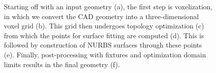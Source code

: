\begin{figure}[ht]
\begin{center}
        \caption{Starting off with an input geometry (a), the first step is voxelization, in which we convert the CAD geometry into a three-dimensional voxel grid (b). This grid then undergoes topology optimization (c) from which the points for surface fitting are computed (d). This is followed by construction of NURBS surfaces through these points (e). Finally, post-processing with fixtures and optimization domain limits results in the final geometry (f).}
        \label{fig:pipeline}
	\end{center}
\end{figure}
